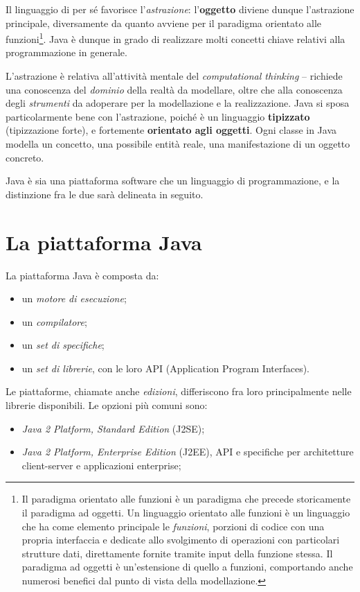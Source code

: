 \documentclass[\fontsizeclass,twocolumn]{\classname}
\theoremstyle{definition}
\theoremstyle{definition}
\begin{document}
Il linguaggio di per sé favorisce l'\emph{astrazione}: l'\textbf{oggetto}
diviene dunque l'astrazione principale, diversamente da quanto avviene per il
paradigma orientato alle funzioni\footnote{Il paradigma orientato alle funzioni
è un paradigma che precede storicamente il paradigma ad oggetti. Un linguaggio
orientato alle funzioni è un linguaggio che ha come elemento principale le
\emph{funzioni}, porzioni di codice con una propria interfaccia e dedicate allo
svolgimento di operazioni con particolari strutture dati, direttamente fornite
tramite input della funzione stessa. Il paradigma ad oggetti è un'estensione di
quello a funzioni, comportando anche numerosi benefici dal punto di vista della
modellazione.}. Java è dunque in grado di realizzare molti concetti chiave
relativi alla programmazione in generale.

L'astrazione è relativa all'attività mentale del \emph{computational thinking}
\--- richiede una conoscenza del \emph{dominio} della realtà da modellare,
oltre che alla conoscenza degli \emph{strumenti} da adoperare per la
modellazione e la realizzazione. Java si sposa particolarmente bene con
l'astrazione, poiché è un linguaggio \textbf{tipizzato} (tipizzazione forte), e fortemente
\textbf{orientato agli oggetti}. Ogni classe in Java modella un concetto, una
possibile entità reale, una manifestazione di un oggetto concreto.

Java è sia una piattaforma software che un linguaggio di programmazione, e la
distinzione fra le due sarà delineata in seguito.

\section{La piattaforma Java}

La piattaforma Java è composta da:

\begin{itemize}
	\item un \emph{motore di esecuzione};
	\item un \emph{compilatore};
	\item un \emph{set di specifiche};
	\item un \emph{set di librerie}, con le loro API (Application Program
		Interfaces).
\end{itemize}

Le piattaforme, chiamate anche \emph{edizioni}, differiscono fra loro
principalmente nelle librerie disponibili. Le opzioni più comuni sono:

\begin{itemize}
	\item \emph{Java 2 Platform, Standard Edition} (J2SE);
    \item \emph{Java 2 Platform, Enterprise Edition} (J2EE), API e specifiche
        per architetture client-server e applicazioni enterprise;
\end{itemize}
\end{document}
